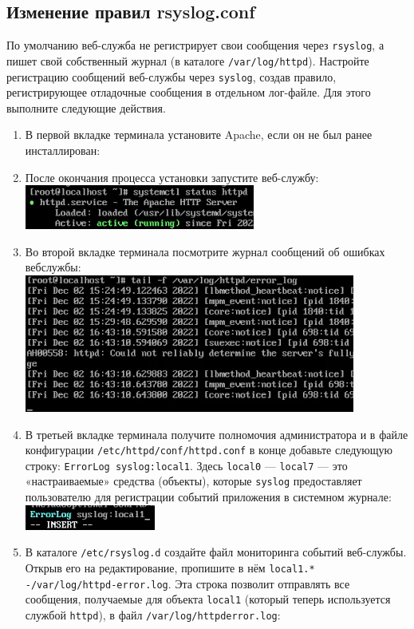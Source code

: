 \documentclass[12pt]{article}
\begin{document}
\subsection{Изменение правил rsyslog.conf}
По умолчанию веб-служба не регистрирует свои сообщения через \texttt{rsyslog}, а пишет свой собственный журнал (в каталоге \texttt{/var/log/httpd}). Настройте регистрацию сообщений веб-службы через \texttt{syslog}, создав правило, регистрирующее отладочные сообщения в отдельном лог-файле. Для этого выполните следующие действия.
\begin{enumerate}
	\item В первой вкладке терминала установите Apache, если он не был ранее инсталлирован:
	\item После окончания процесса установки запустите веб-службу:
	      \\\includegraphics{6.png}
	\item Во второй вкладке терминала посмотрите журнал сообщений об ошибках вебслужбы:
	      \\\includegraphics{7.png}
	\item В третьей вкладке терминала получите полномочия администратора и в файле конфигурации \texttt{/etc/httpd/conf/httpd.conf} в конце добавьте следующую строку: \texttt{ErrorLog syslog:local1}. Здесь \texttt{local0} — \texttt{local7} — это «настраиваемые» средства (объекты), которые \texttt{syslog} предоставляет пользователю для регистрации событий приложения в системном журнале:
	      \\\includegraphics{8.png}
	\item В каталоге \texttt{/etc/rsyslog.d} создайте файл мониторинга событий веб-службы. Открыв его на редактирование, пропишите в нём \texttt{local1.* -/var/log/httpd-error.log}. Эта строка позволит отправлять все сообщения, получаемые для объекта \texttt{local1} (который теперь используется службой \texttt{httpd}), в файл \texttt{/var/log/httpderror.log}:

\end{enumerate}
\end{document}
